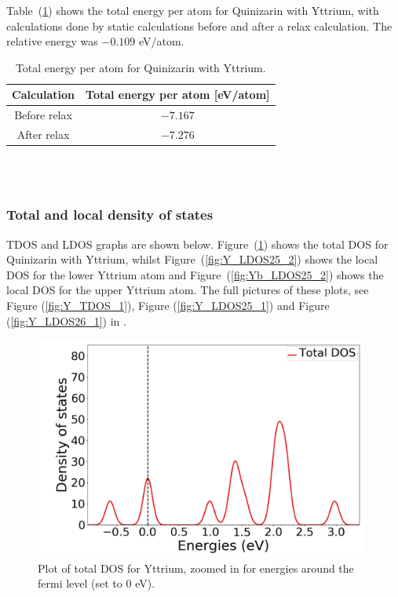 \documentclass{article}
\begin{document}
      Table~(\ref{tab:TOTENY}) shows the total energy per atom for Quinizarin with Yttrium, with calculations done by static calculations before and after a relax calculation. The relative energy was $-0.109$ eV/atom. \\

      \begin{table}[H]
        \centering
        \caption{Total energy per atom for Quinizarin with Yttrium. }
        \vspace{0mm}
        \label{tab:TOTENY}
        \begin{tabular}{|c|c|}
            \hline
            Calculation & Total energy per atom [eV/atom]  \\
            \hline \hline
            Before relax & $-7.167$ \\
            After relax & $-7.276$ \\
            \hline
        \end{tabular} \\
        \hspace{0pt}\\
      \end{table}

      \vspace{1cm}

    \subsubsection{Total and local density of states}

      TDOS and LDOS graphs are shown below. Figure~(\ref{fig:Y_TDOS_2}) shows the total DOS for Quinizarin with Yttrium, whilst Figure~(\ref{fig:Y_LDOS25_2}) shows the local DOS for the lower Yttrium atom and Figure~(\ref{fig:Yb_LDOS25_2}) shows the local DOS for the upper Yttrium atom.
      The full pictures of these plots, see Figure (\ref{fig:Y_TDOS_1}), Figure (\ref{fig:Y_LDOS25_1}) and Figure (\ref{fig:Y_LDOS26_1}) in . \\

      \begin{figure}[H]
        \centering
        \includegraphics[width = 11cm]{../fig/Y_TDOS_2.png}
        \caption{Plot of total DOS for Yttrium, zoomed in for energies around the fermi level (set to 0 eV). }
        \label{fig:Y_TDOS_2}
      \end{figure}
\end{document}
